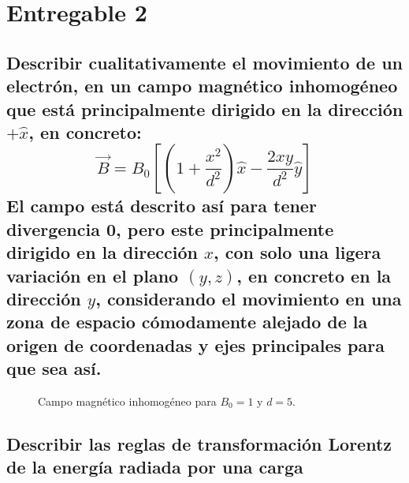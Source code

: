 \documentclass{article}
\begin{document}
\section{Entregable 2}

\subsection{Describir cualitativamente el movimiento de un electrón, en un campo magnético inhomogéneo que está principalmente dirigido en la dirección $+\hat{x}$, en concreto: 
\[
\vec{B} = B_0 \left[\left( 1 + \frac{x^2}{d^2} \right) \hat{x} - \frac{2xy}{d^2} \hat{y}\right]
\]
El campo está descrito así para tener divergencia 0, pero este principalmente dirigido en la dirección $x$, con solo una ligera variación en el plano $(y,z)$, en concreto en la dirección $y$, considerando el movimiento en una zona de espacio cómodamente alejado de la origen de coordenadas y ejes principales para que sea así.}

\begin{figure}[ht]
    \centering
    \caption{Campo magnético inhomogéneo para $B_{0}=1$ y $d=5$.}
    \label{fig:field}
\end{figure}


\subsection{Describir las reglas de transformación Lorentz de la energía radiada por una carga}
\end{document}
